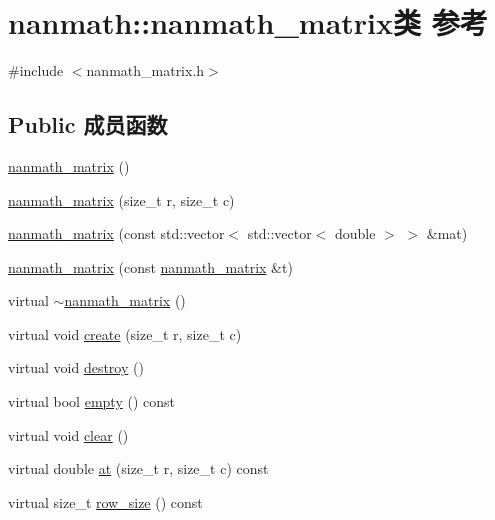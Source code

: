 \hypertarget{classnanmath_1_1nanmath__matrix}{}\section{nanmath\+:\+:nanmath\+\_\+matrix类 参考}
\label{classnanmath_1_1nanmath__matrix}


{\ttfamily \#include $<$nanmath\+\_\+matrix.\+h$>$}

\subsection*{Public 成员函数}
\begin{DoxyCompactItemize}
\item 
\hyperlink{classnanmath_1_1nanmath__matrix_a4f0a09745fd4a7563a9462358a4cf9f3}{nanmath\+\_\+matrix} ()
\item 
\hyperlink{classnanmath_1_1nanmath__matrix_a16873cc6b8741de29e1d7a596ee8836c}{nanmath\+\_\+matrix} (size\+\_\+t r, size\+\_\+t c)
\item 
\hyperlink{classnanmath_1_1nanmath__matrix_ad2712c998744cec123026fe3cbb7b5da}{nanmath\+\_\+matrix} (const std\+::vector$<$ std\+::vector$<$ double $>$ $>$ \&mat)
\item 
\hyperlink{classnanmath_1_1nanmath__matrix_aa0a5698fe01db8ee25bd9d8fbe646628}{nanmath\+\_\+matrix} (const \hyperlink{classnanmath_1_1nanmath__matrix}{nanmath\+\_\+matrix} \&t)
\item 
virtual \hyperlink{classnanmath_1_1nanmath__matrix_a41cc1dac91f6ef08f9b3ec1baf1af3e3}{$\sim$nanmath\+\_\+matrix} ()
\item 
virtual void \hyperlink{classnanmath_1_1nanmath__matrix_a0d9762b03f6e27563bbdf821be78342d}{create} (size\+\_\+t r, size\+\_\+t c)
\item 
virtual void \hyperlink{classnanmath_1_1nanmath__matrix_a8a1432e6ebd91c5035285ee47c747798}{destroy} ()
\item 
virtual bool \hyperlink{classnanmath_1_1nanmath__matrix_a2765fada7b320d2b4fdb8bd705e3b042}{empty} () const 
\item 
virtual void \hyperlink{classnanmath_1_1nanmath__matrix_a65c42ef1d4dca4553ffd13fcc0258a74}{clear} ()
\item 
virtual double \hyperlink{classnanmath_1_1nanmath__matrix_abeecd392efba8d91e4f0e1151199d063}{at} (size\+\_\+t r, size\+\_\+t c) const 
\item 
virtual size\+\_\+t \hyperlink{classnanmath_1_1nanmath__matrix_a15dc80fe330112c1a17ef6f7de168943}{row\+\_\+size} () const 

\end{DoxyCompactItemize}
